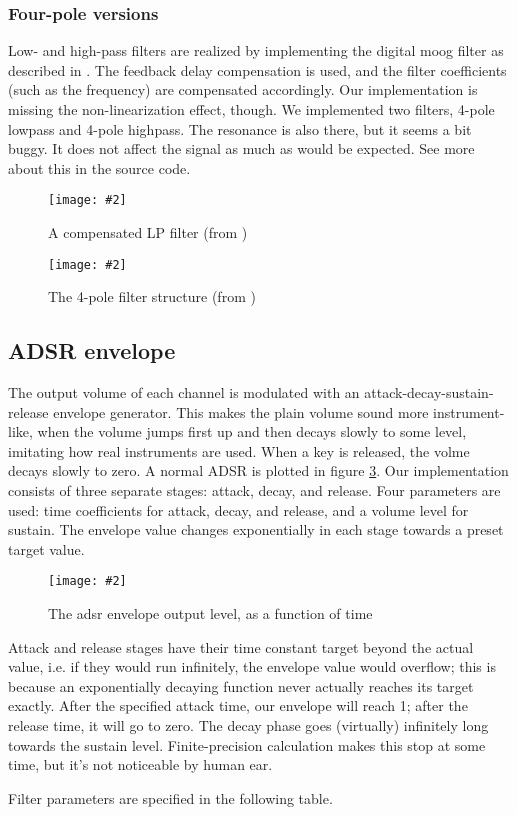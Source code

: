 \documentclass[10pt,a4paper,oneside]{article}
\newcommand{\kuvaa}[4]{%
	\begin{figure}[h]%
		\centering \texttt{[image: \#2]}%
		\caption{#3 \label{#4}}%
	\end{figure}%
}
\newcommand{\kuva}[2]{\kuvaa{0.99}{#1}{#2}{fig:#1}}
\begin{document}
\subsubsection{Four-pole versions}

Low- and high-pass filters are realized by implementing the digital moog filter as described in \cite{algos}. The feedback delay compensation is used, and the filter coefficients (such as the frequency) are compensated accordingly. Our implementation is missing the non-linearization effect, though. We implemented two filters, 4-pole lowpass and 4-pole highpass. The resonance is also there, but it seems a bit buggy. It does not affect the signal as much as would be expected. See more about this in the source code.

\kuva{compfilt.png}{A compensated LP filter (from \cite{algos})}
\kuva{filt4p.png}{The 4-pole filter structure (from \cite{algos})}

\subsection{ADSR envelope}

The output volume of each channel is modulated with an attack-decay-sustain-release envelope generator. This makes the plain volume sound more instrument-like, when the volume jumps first up and then decays slowly to some level, imitating how real instruments are used. When a key is released, the volme decays slowly to zero. A normal ADSR is plotted in figure \ref{fig:adsr}. Our implementation consists of three separate stages: attack, decay, and release. Four parameters are used: time coefficients for attack, decay, and release, and a volume level for sustain. The envelope value changes exponentially in each stage towards a preset target value.

\kuva{adsr}{The adsr envelope output level, as a function of time}

Attack and release stages have their time constant target beyond the actual value, i.e. if they would run infinitely, the envelope value would overflow; this is because an exponentially decaying function never actually reaches its target exactly. After the specified attack time, our envelope will reach 1; after the release time, it will go to zero. The decay phase goes (virtually) infinitely long towards the sustain level. Finite-precision calculation makes this stop at some time, but it's not noticeable by human ear.

Filter parameters are specified in the following table.
\end{document}
